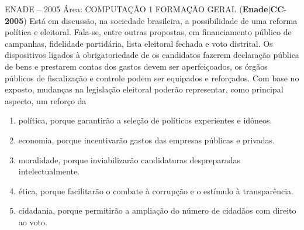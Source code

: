 \documentclass{exam}
\begin{document}
\begin{questions}
ENADE – 2005 Área: COMPUTAÇÃO 1
FORMAÇÃO GERAL
\question (\textbf{Enade}$|$\textbf{CC}-\textbf{2005}) Está em discussão, na sociedade brasileira, a possibilidade de uma
reforma política e eleitoral. Fala-se, entre outras propostas, em
financiamento público de campanhas, fidelidade partidária, lista
eleitoral fechada e voto distrital. Os dispositivos ligados à
obrigatoriedade de os candidatos fazerem declaração pública de
bens e prestarem contas dos gastos devem ser aperfeiçoados, os
órgãos públicos de fiscalização e controle podem ser equipados
e reforçados.
Com base no exposto, mudanças na legislação eleitoral poderão
representar, como principal aspecto, um reforço da
	\begin{enumerate}[label=\alph*)]
		\item  política, porque garantirão a seleção de políticos experientes
e idôneos.
		\item  economia, porque incentivarão gastos das empresas públicas
e privadas.
		\item  moralidade, porque inviabilizarão candidaturas despreparadas
intelectualmente.
		\item  ética, porque facilitarão o combate à corrupção e o estímulo
à transparência.
		\item  cidadania, porque permitirão a ampliação do número de
cidadãos com direito ao voto.

	\end{enumerate}


\end{questions}
\end{document}
